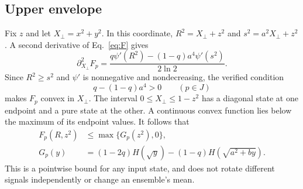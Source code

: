 \documentclass[aps,pra,reprint,amsmath,amssymb,longbibliography,nofootinbib]{revtex4-2}
\begin{document}
\subsection{Upper envelope}
Fix $z$ and let $X_\perp=x^2+y^2$. In this coordinate,
$R^2=X_\perp+z^2$ and $s^2=a^2X_\perp+z^2$. A second derivative of Eq.~\eqref{eq:F} gives
\begin{equation}
 \partial_{X_\perp}^2F_p=
 \frac{q\psi'(R^2)-(1-q)a^4\psi'(s^2)}{2\ln2}.
 \label{eq:transverse}
\end{equation}
Since $R^2\ge s^2$ and $\psi'$ is nonnegative and nondecreasing, the verified condition
\begin{equation}
 q-(1-q)a^4>0\qquad(p\in J)
 \label{eq:convexcondition}
\end{equation}
makes $F_p$ convex in $X_\perp$. The interval $0\le X_\perp\le1-z^2$ has a diagonal state at one endpoint and a pure state at the other. A continuous convex function lies below the maximum of its endpoint values. It follows that
\begin{align}
 F_p(R,z^2)&\le\max\{G_p(z^2),0\},\label{eq:axisreduction}\\
 G_p(y)&=(1-2q)H(\sqrt y)
          -(1-q)H(\sqrt{a^2+by}).\label{eq:G}
\end{align}
This is a pointwise bound for any input state, and does not rotate different signals independently or change an ensemble's mean.
\end{document}
